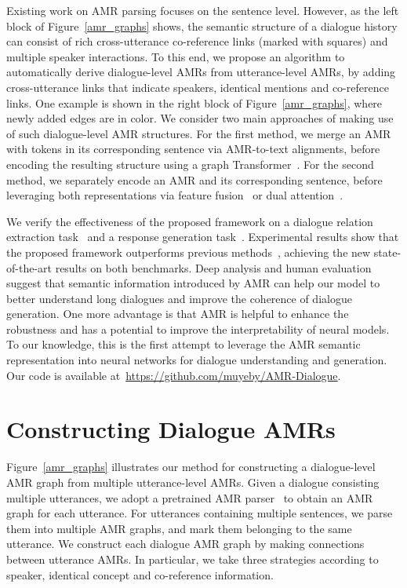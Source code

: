 \documentclass[11pt,a4paper]{article}
\begin{document}
Existing work on AMR parsing focuses on the sentence level. 
However, as the left block of Figure~\ref{amr_graphs} shows, the semantic structure of a dialogue history can consist of rich cross-utterance co-reference links (marked with squares) and multiple speaker interactions.
To this end, we propose an algorithm to automatically derive dialogue-level AMRs from utterance-level AMRs, by adding cross-utterance links that indicate speakers, identical mentions and co-reference links. 
One example is shown in the right block of Figure~\ref{amr_graphs}, where newly added edges are in color.
We consider two main approaches of making use of such dialogue-level AMR structures. 
For the first method, we merge an AMR with tokens in its corresponding sentence via AMR-to-text alignments, before encoding the resulting structure using a graph Transformer~\cite{zhu2019modeling}. 
For the second method, we separately encode an AMR and its corresponding sentence, before leveraging both representations via feature fusion~\cite{Mangai10} or dual attention~\cite{calixto2017doubly}.


We verify the effectiveness of the proposed framework on a dialogue relation extraction task~\citep{yu-2020-dialogue} and a response generation task~\citep{li-etal-2017-dailydialog}.
Experimental results show that the proposed framework outperforms previous methods~\citep{vaswani2017attention,bao-etal-2020-plato,yu-2020-dialogue}, achieving the new state-of-the-art results on both benchmarks. 
Deep analysis and human evaluation suggest that semantic information introduced by AMR can help our model to better understand long dialogues and improve the coherence of dialogue generation.
One more advantage is that AMR is helpful to enhance the robustness and has a potential to improve the interpretability of neural models.
To our knowledge, this is the first attempt to leverage the AMR semantic representation into neural networks for dialogue understanding and generation.
Our code is available at~\url{https://github.com/muyeby/AMR-Dialogue}.


\section{Constructing Dialogue AMRs}
\label{sec:dialogue-AMR}




Figure~\ref{amr_graphs} illustrates our method for constructing a dialogue-level AMR graph from multiple utterance-level AMRs.
Given a dialogue consisting multiple utterances, we adopt a pretrained AMR parser~\citep{cai-lam-2020-amr} to obtain an AMR graph for each utterance.
For utterances containing multiple sentences, we parse them into multiple AMR graphs, and mark them belonging to the same utterance.
We construct each dialogue AMR graph by making connections between utterance AMRs.
In particular, we take three strategies according to speaker, identical concept and co-reference information.
\end{document}
